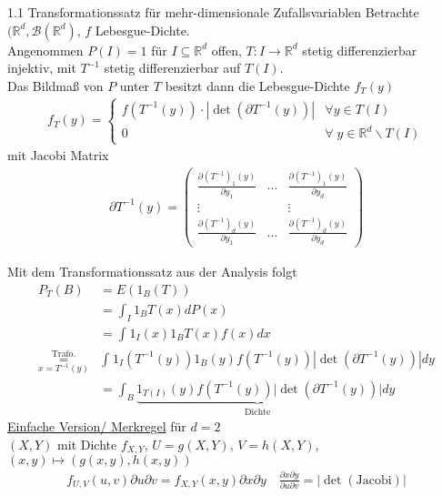 \documentclass[a4paper,openany]{book}
\theoremstyle{mytheoremstyle}
\theoremstyle{mytheoremstyle2}
\newtheorem*{cbew}{Beweis}
\newenvironment{bew}[1][]{%
  \ifthenelse{\boolean{showbew}}{%
    \begin{cbew}[#1]%
  }{%
    \expandafter\comment%
  }%
}{%
  \ifthenelse{\boolean{showbew}}{%
    \end{cbew}%
  }{%
    \expandafter\endcomment%
  }%
}
\begin{document}
\begin{lem}{1.1 Transformationssatz für mehr-dimensionale Zufallsvariablen}{}
Betrachte $(\mathbb{R}^d,\mathcal{B}(\mathbb{R}^d)$, $f$ Lebesgue-Dichte. \\
Angenommen $P(I)=1$ für $I \subseteq \mathbb{R}^d$ offen, $T:I\to \mathbb{R}^d$ stetig differenzierbar injektiv, mit $T ^{-1}$ stetig differenzierbar auf $T(I)$. \\
Das Bildmaß von $P$ unter $T$ besitzt dann die Lebesgue-Dichte $f_T(y)$
 \begin{align*}
   f_T(y)=
  \begin{cases}
    f(T ^{-1}(y))\cdot |\det(\partial T ^{-1}(y))|&\forall y \in  T(I)\\
    0&\forall\;y \in \mathbb{R}^d \backslash T(I)
  \end{cases}
 \end{align*}
 mit Jacobi Matrix
 \begin{align*}
  \partial T ^{-1}(y)=
  \begin{pmatrix}
    \frac{\partial (T ^{-1})_1(y)}{\partial y_1}&...&\frac{\partial(T ^{-1})_1(y)}{\partial y_d}\\\vdots&&\vdots\\\frac{\partial (T ^{-1})_d(y)}{\partial y_1}&...&\frac{\partial(T ^{-1})_d(y)}{\partial y_d}
  \end{pmatrix}
 \end{align*}
\end{lem}
\begin{bew}[]
  Mit dem Transformationssatz aus der Analysis folgt
  \begin{align*}
    P_T(B)&=E (1_{B}(T))\\
          &=\int_{I}^{}{1_{B}T(x)dP(x)}\\
          &=\int_{}^{}{1_{I}(x)1_{B}T(x)f(x)dx}\\
    \overset{\text{Trafo.}}{\underset{x=T ^{-1}(y)}{=}}&\int_{}^{}{1_I(T ^{-1}(y))1_B(y)f(T ^{-1}(y))|\det(\partial T ^{-1}(y))|dy}\\
          &=\int_{B}^{}{\underbrace{1_{T(I)}(y)f(T ^{-1}(y))|\det(\partial T ^{-1}(y))}_{\text{Dichte}}}|dy
  \end{align*}
\end{bew}
\noindent\underline{Einfache Version/ Merkregel} für $d=2$\\
$(X,Y)$ mit Dichte $f_{X,Y}$, $U=g(X,Y)$, $V=h(X,Y)$, $(x,y)\mapsto (g(x,y),h(x,y))$ 
\begin{align*}
  f_{U,V}(u,v)\partial u\partial v=f_{X,Y}(x,y)\partial x\partial y\quad  \frac{\partial x\partial y}{\partial u\partial v}=|\det(\text{Jacobi})|
\end{align*}
\end{document}

